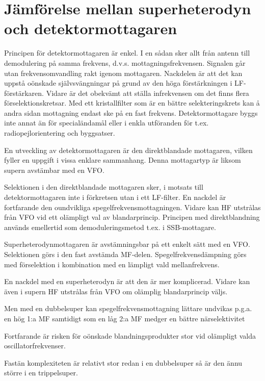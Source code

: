 \section[Jämförelse superheterodyn]{Jämförelse mellan superheterodyn och detektormottagaren}
\label{superheterojämförelse}

Principen för detektormottagaren är enkel. I en sådan sker allt från
antenn till demodulering på samma frekvens,
d.v.s. mottagningsfrekvensen. Signalen går utan frekvensomvandling
rakt igenom mottagaren. Nackdelen är att det kan uppstå oönskade
självsvängningar på grund av den höga förstärkningen i
LF-förstärkaren. Vidare är det obekvämt att ställa infrekvensen om det
finns flera förselektionskretsar. Med ett kristallfilter som är en
bättre selekteringskrets kan å andra sidan mottagning endast ske på en
fast frekvens. Detektormottagare byggs inte annat än för
specialändamål eller i enkla utföranden för
t.ex. radiopejlorientering och byggsatser.

En utveckling av detektormottagaren är den direktblandade mottagaren,
vilken fyller en uppgift i vissa enklare sammanhang.  Denna mottagartyp
är liksom supern avstämbar med en VFO.

Selektionen i den direktblandade mottagaren sker, i motsats till
detektormottagaren inte i förkretsen utan i ett LF-filter. En nackdel
är fortfarande den oundvikliga spegelfrekvensmottagningen. Vidare kan
HF utstrålas från VFO vid ett olämpligt val av
blandarprincip. Principen med direktblandning används emellertid som
demoduleringsmetod t.ex. i SSB-mottagare.

Superheterodynmottagaren är avstämningsbar på ett enkelt sätt med en
VFO. Selektionen görs i den fast avstämda
MF-delen. Spegelfrekvensdämpning görs med förselektion i kombination
med en lämpligt vald mellanfrekvens.

En nackdel med en superheterodyn är att den är mer komplicerad. Vidare
kan även i supern HF utstrålas från VFO om olämplig blandarprincip
väljs.

Men med en dubbelsuper kan spegelfrekvensmottagning lättare undvikas
p.g.a.  en hög 1:a MF samtidigt som en låg 2:a MF medger en bättre
närselektivitet

Fortfarande är risken för oönskade blandningsprodukter stor vid
olämpligt valda oscillatorfrekvenser.

Fastän komplexiteten är relativt stor redan i en dubbelsuper så är den
ännu större i en trippelsuper.
